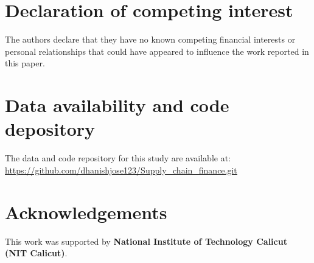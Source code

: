 \documentclass[12pt]{article}
\begin{document}
	
	\section*{Declaration of competing interest}
	The authors declare that they have no known competing financial interests or personal relationships 
	that could have appeared to influence the work reported in this paper.
	
	\section*{Data availability and code depository}
	The data and code repository for this study are available at: \url{https://github.com/dhanishjose123/Supply_chain_finance.git}
	
	\section*{Acknowledgements}
	This work was supported by \textbf{National Institute of Technology Calicut (NIT Calicut)}.
	

	
\end{document}
